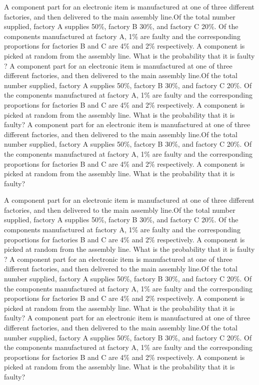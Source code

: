 A component part for an electronic item is
manufactured at one of three different factories, and then delivered to
the main assembly line.Of the total number supplied, factory A supplies
50\%, factory B 30\%, and factory C 20\%. Of the components
manufactured at factory A, 1\% are faulty and the corresponding
proportions for factories B and C are 4\% and 2\% respectively. A
component is picked at random from the assembly line. What is the
probability that it is faulty \cite{ilyas2004hsn}? 
A component part for an electronic item is
manufactured at one of three different factories, and then delivered to
the main assembly line.Of the total number supplied, factory A supplies
50\%, factory B 30\%, and factory C 20\%. Of the components
manufactured at factory A, 1\% are faulty and the corresponding
proportions for factories B and C are 4\% and 2\% respectively. A
component is picked at random from the assembly line. What is the
probability that it is faulty? 
A component part for an electronic item is
manufactured at one of three different factories, and then delivered to
the main assembly line.Of the total number supplied, factory A supplies
50\%, factory B 30\%, and factory C 20\%. Of the components
manufactured at factory A, 1\% are faulty and the corresponding
proportions for factories B and C are 4\% and 2\% respectively. A
component is picked at random from the assembly line. What is the
probability that it is faulty? 

A component part for an electronic item is
manufactured at one of three different factories, and then delivered to
the main assembly line.Of the total number supplied, factory A supplies
50\%, factory B 30\%, and factory C 20\%. Of the components
manufactured at factory A, 1\% are faulty and the corresponding
proportions for factories B and C are 4\% and 2\% respectively. A
component is picked at random from the assembly line. What is the
probability that it is faulty \cite{ilyas2004hsn}? 
A component part for an electronic item is
manufactured at one of three different factories, and then delivered to
the main assembly line.Of the total number supplied, factory A supplies
50\%, factory B 30\%, and factory C 20\%. Of the components
manufactured at factory A, 1\% are faulty and the corresponding
proportions for factories B and C are 4\% and 2\% respectively. A
component is picked at random from the assembly line. What is the
probability that it is faulty? 
A component part for an electronic item is
manufactured at one of three different factories, and then delivered to
the main assembly line.Of the total number supplied, factory A supplies
50\%, factory B 30\%, and factory C 20\%. Of the components
manufactured at factory A, 1\% are faulty and the corresponding
proportions for factories B and C are 4\% and 2\% respectively. A
component is picked at random from the assembly line. What is the
probability that it is faulty? 



